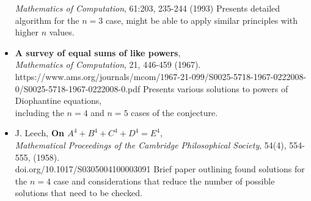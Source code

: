 \documentclass{article}
\begin{document}
\begin{itemize}
        \textit{Mathematics of Computation}, 61:203, 235-244 (1993)
        \subitem Presents detailed algorithm for the $n=3$ case, might be able to apply similar principles with higher $n$ values. \\
    \item {\bf A survey of equal sums of like powers}, \\
        \textit{Mathematics of Computation}, 21, 446-459 (1967). \\
        https://www.ams.org/journals/mcom/1967-21-099/S0025-5718-1967-0222008-0/S0025-5718-1967-0222008-0.pdf 
        \subitem Presents various solutions to powers of Diophantine equations, \\
        including the $n=4$ and $n=5$ cases of the conjecture. 
    \item J. Leech, {\bf On $A^4 + B^4 + C^4 + D^4 = E^4$}, \\ 
        \textit{Mathematical Proceedings of the Cambridge Philosophical Society}, 54(4), 554-555, (1958). \\
        doi.org/10.1017/S0305004100003091
        \subitem Brief paper outlining found solutions for the $n=4$ case and considerations that reduce the number of possible solutions that need to be checked. 
\end{itemize}
\end{document}
